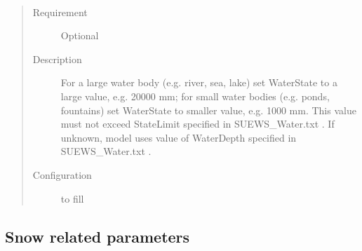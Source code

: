 \documentclass[letterpaper,10pt,english]{sphinxmanual}
\begin{document}
\begin{fulllineitems}
\label{\detokenize{input_files/Initial_Conditions/Above_Ground_State:cmdoption-arg-waterstate}}~\begin{quote}\begin{description}
\item[{Requirement}] \leavevmode
Optional

\item[{Description}] \leavevmode
For a large water body (e.g. river, sea, lake) set WaterState to a large value, e.g. 20000 mm; for small water bodies (e.g. ponds, fountains) set WaterState to smaller value, e.g. 1000 mm. This value must not exceed StateLimit specified in SUEWS\_Water.txt . If unknown, model uses value of WaterDepth specified in SUEWS\_Water.txt .

\item[{Configuration}] \leavevmode
to fill

\end{description}\end{quote}

\end{fulllineitems}



\subsection{Snow related parameters}
\label{\detokenize{input_files/Initial_Conditions/Snow_related_parameters:snow-related-parameters}}\label{\detokenize{input_files/Initial_Conditions/Snow_related_parameters::doc}}\label{\detokenize{input_files/Initial_Conditions/Snow_related_parameters:id1}}
\end{document}
